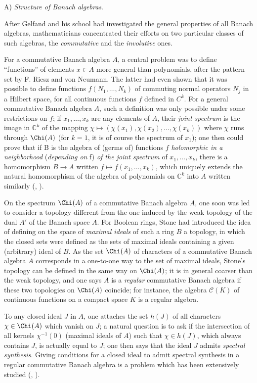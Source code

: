 \documentclass[12pt,a4paper,leqno,twoside]{extbook}
\newcommand{\Cont}{\mathcal{C}}
\newcommand{\C}{\mathbb{C}}
\begin{document}
A) \emph{Structure of Banach algebras}.

After Gelfand and his school had investigated the general properties of all Banach algebras, mathematicians concentrated their efforts on two particular classes of such algebras, the \emph{commutative} and the \emph{involutive} ones.

For a commutative Banach algebra \(A\), a central problem was to define ``functions'' of elements \(x \in A\) more general than polynomials, after the pattern set by F. Riesz and von Neumann. The latter had even shown that it was possible to define functions \(f(N_1, \ldots, N_k)\) of commuting normal operators \(N_j\) in a Hilbert space, for all continuous functions \(f\) defined in \(C^k\). For a general commutative Banach algebra \(A\), such a definition was only possible under some restrictions on \(f\); if \(x_1, \ldots, x_k\) are any elements of \(A\), their \emph{joint spectrum} is the image in \(\C^k\) of the mapping \(\chi \mapsto (\chi(x_1), \chi(x_2), \ldots, \chi(x_k))\) where \(\chi\) runs through \(\Chi(A)\) (for \(k = 1\), it is of course the spectrum of \(x_1\)); one then could prove that if B is the algebra of (germs of) functions \(f\) \emph{holomorphic in a neighborhood} (\emph{depending on} f) \emph{of the joint spectrum} of \(x_1, \ldots, x_k\), there is a homomorphism \(B \to A\) written \(f \mapsto f(x_1, \ldots, x_k)\), which uniquely extends the natural homomorphism of the algebra of polynomials on \(\C^k\) into \(A\) written similarly (\cite{222}, \cite{027}).

On the spectrum \(\Chi(A)\) of a commutative Banach algebra \(A\), one soon was led to consider a topology different from the one induced by the weak topology of the dual \(A'\) of the Banach space \(A\). For Boolean rings, Stone had introduced the idea of defining on the space of \emph{maximal ideals} of such a ring \(B\) a topology, in which the closed sets were defined as the sets of maximal ideals containing a given (arbitrary) ideal of \(B\). As the set \(\Chi(A)\) of characters of a commutative Banach algebra \(A\) corresponds in a one-to-one way to the set of maximal ideals, Stone's topology can be defined in the same way on \(\Chi(A)\); it is in general coarser than the weak topology, and one says \(A\) is a \emph{regular} commutative Banach algebra if these two topologies on \(\Chi(A)\) coincide; for instance, the algebra \(\Cont(K)\) of continuous functions on a compact space \(K\) is a regular algebra.

To any closed ideal \(J\) in \(A\), one attaches the set \(h(J)\) of all characters \(\chi \in \Chi(A)\) which vanish on \(J\); a natural question is to ask if the intersection of all kernels \(\chi^{-1}(0)\) (maximal ideals of \(A\)) such that \(\chi \in h(J)\), which always contains \(J\), is actually equal to \(J\); one then says that the ideal \(J\) admits \emph{spectral synthesis}. Giving conditions for a closed ideal to admit spectral synthesis in a regular commutative Banach algebra is a problem which has been extensively studied (\cite{021}, \cite{058}).
\end{document}
